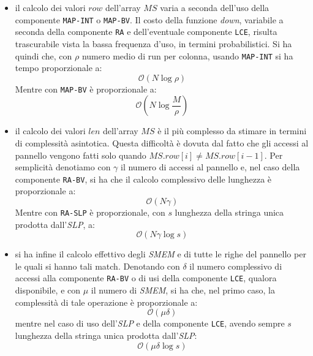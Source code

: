 \begin{itemize}
  \item il calcolo dei valori $row$ dell'array $MS$ varia a seconda dell'uso
  della componente \texttt{MAP-INT} o \texttt{MAP-BV}. Il costo della funzione
  \textit{down}, variabile a seconda della componente \texttt{RA} e
  dell'eventuale componente \texttt{LCE}, risulta trascurabile vista la bassa
  frequenza d'uso, in termini probabilistici. Si ha quindi che, con $\rho$
  numero medio di run per colonna, usando \texttt{MAP-INT} si ha tempo
  proporzionale a:
  \begin{equation}
    \label{eq:msthr1int}
    \mathcal{O}(N\log\rho)
  \end{equation}
  Mentre con \texttt{MAP-BV} è proporzionale a:
  \begin{equation}
    \label{eq:msthr1bv}
    \mathcal{O}\left(N\log\frac{M}{\rho}\right)
  \end{equation}
  
  \item il calcolo dei valori $len$ dell'array $MS$ è il più complesso da
  stimare in termini di complessità asintotica. Questa difficoltà è dovuta dal
  fatto che gli accessi al pannello vengono fatti solo quando $MS.row[i]\neq
  MS.row[i-1]$. Per semplicità denotiamo con $\gamma$ il numero di accessi al
  pannello e, nel caso della componente \texttt{RA-BV}, si ha che il calcolo
  complessivo delle lunghezza è proporzionale a:
  \begin{equation}
    \label{eq:msthr2bv}
    \mathcal{O}(N\gamma)
  \end{equation}
  Mentre con \texttt{RA-SLP} è proporzionale, con $s$ lunghezza della stringa
  unica prodotta dall'\textit{SLP}, a:
  \begin{equation}
    \label{eq:msthr2slp}
    \mathcal{O}\left(N\gamma\log s\right)
  \end{equation}
  \item si ha infine il calcolo effettivo degli \textit{SMEM} e di tutte le
  righe del pannello per le quali si hanno tali match. Denotando con $\delta$ il
  numero complessivo di accessi alla componente \texttt{RA-BV} o di usi della
  componente \texttt{LCE}, qualora disponibile, e con $\mu$ il numero di
  \textit{SMEM}, si ha che, nel primo caso, la complessità di tale operazione è
  proporzionale a:
  \begin{equation}
    \label{eq:msthr3bv}
    \mathcal{O}(\mu\delta)
  \end{equation}
  mentre nel caso di uso dell'\textit{SLP} e della componente \texttt{LCE},
  avendo sempre $s$ lunghezza della stringa unica prodotta dall'\textit{SLP}:
  \begin{equation}
    \label{eq:msthr3slp}
    \mathcal{O}(\mu\delta\log s)
  \end{equation}
\end{itemize}
